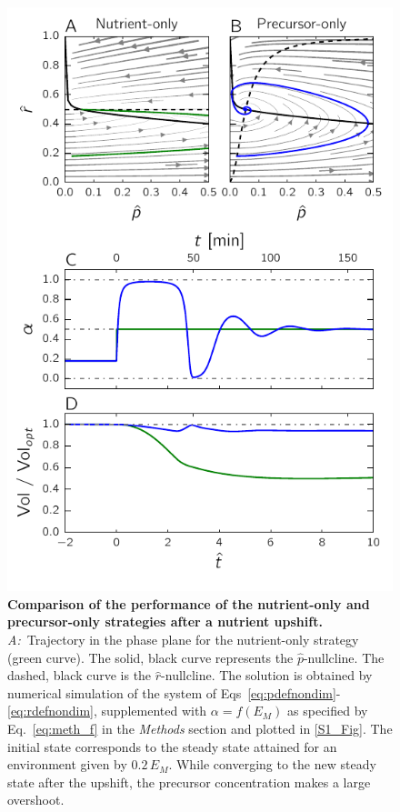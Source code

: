 \begin{figure}[p]
\centering
\includegraphics[scale=1]{./Fig/Fig6}
\caption{
\textbf{Comparison of the performance of the nutrient-only and precursor-only strategies after a nutrient upshift.}
\textit{A:}~Trajectory in the phase plane for the nutrient-only strategy (green curve).
The solid, black curve represents the $\hat{p}$-nullcline.
The dashed, black curve is the $\hat{r}$-nullcline.
The solution is obtained by numerical simulation of the system of Eqs~\ref{eq:pdefnondim}-\ref{eq:rdefnondim}, supplemented with $\alpha = f(E_M)$ as specified by Eq.~\ref{eq:meth_f} in the \textit{Methods} section and plotted in \ref{S1_Fig}.
The initial state corresponds to the steady state attained for an environment given by $0.2 \, E_M$.
While converging to the new steady state after the upshift, the precursor concentration makes a large overshoot.
}
\end{figure}
